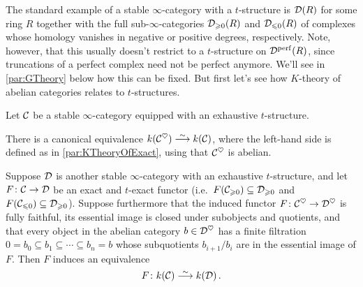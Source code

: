 \documentclass[a4paper, 10pt, oneside, DIV=9, chapterprefix=true, numbers=enddot,bibliography=totoc]{scrbook}
\newcommand{\embrace}[1]{\textup{(}#1\textup{)}}
\begin{document}
The standard example of a stable $\infty$-category with a $t$-structure is $\mathcal{D}(R)$ for some ring $R$ together with the full sub-$\infty$-categories $\mathcal{D}_{\geqslant 0}(R)$ and $\mathcal{D}_{\leqslant 0}(R)$ of complexes whose homology vanishes in negative or positive degrees, respectively. Note, however, that this usually doesn't restrict to a $t$-structure on $\mathcal{D}^{\mathrm{perf}}(R)$, since truncations of a perfect complex need not be perfect anymore. We'll see in \cref{par:GTheory} below how this can be fixed. But first let's see how $K$-theory of abelian categories relates to $t$-structures.
\begin{thm}\label{thm:BarwickHeart}
	Let $\mathcal{C}$ be a stable $\infty$-category equipped with an exhaustive $t$-structure.
	\begin{alphanumerate}
		\item There is a canonical equivalence $k(\Cc^\heartsuit)\isomorphism k(\Cc)$, where the left-hand side is defined as in \cref{par:KTheoryOfExact}, using that $\mathcal{C}^\heartsuit$ is abelian.
		\item Suppose $\mathcal{D}$ is another stable $\infty$-category with an exhaustive $t$-structure, and let $F\colon \Cc\morphism \Dd$ be an exact and $t$-exact functor \embrace{i.e.\ $F(\mathcal{C}_{\geqslant 0})\subseteq \mathcal{D}_{\geqslant 0}$ and $F(\mathcal{C}_{\leqslant 0})\subseteq \mathcal{D}_{\geqslant 0}$}. Suppose furthermore that the induced functor $F\colon \Cc^\heartsuit\morphism \Dd^\heartsuit$ is fully faithful, its essential image is closed under subobjects and quotients, and that every object in the abelian category $b\in \mathcal{D}^\heartsuit$ has a finite filtration $0=b_0\subseteq b_1\subseteq \dotsb\subseteq b_n=b$ whose subquotients $b_{i+1}/b_i$ are in the essential image of $F$. Then $F$ induces an equivalence
		\begin{equation*}
			F\colon k(\Cc)\isomorphism k(\Dd)\,.
		\end{equation*}
	\end{alphanumerate}
\end{thm}
\end{document}
